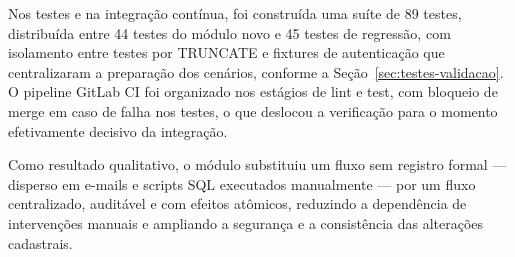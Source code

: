 Nos testes e na integração contínua, foi construída 
uma suíte de 89 testes, distribuída entre 44 testes 
do módulo novo e 45 testes de regressão, com isolamento 
entre testes por TRUNCATE e fixtures de autenticação que 
centralizaram a preparação dos cenários, conforme a Seção~\ref{sec:testes-validacao}. 
O pipeline GitLab CI foi organizado nos estágios de lint e 
test, com bloqueio de merge em caso de falha nos testes, 
o que deslocou a verificação para o momento efetivamente decisivo da integração.

Como resultado qualitativo, o módulo substituiu um fluxo 
sem registro formal — disperso em e-mails e scripts SQL 
executados manualmente — por um fluxo centralizado, auditável e 
com efeitos atômicos, reduzindo a dependência de intervenções 
manuais e ampliando a segurança e a consistência das alterações cadastrais.